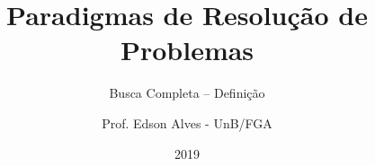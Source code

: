 \title{Paradigmas de Resolução de Problemas}
\subtitle{Busca Completa -- Definição}
\author{Prof. Edson Alves - UnB/FGA}
\date{2019}
